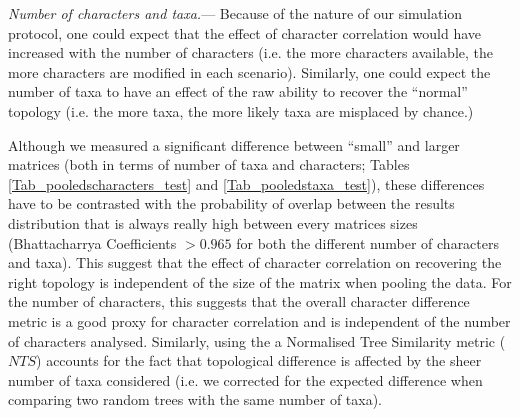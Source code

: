 \documentclass[12pt,letterpaper]{article}
\renewcommand{\subsubsection}[1]{%
\vspace{2ex}
\noindent
\textit{#1.}---}
\begin{document}
\subsubsection{Number of characters and taxa}
Because of the nature of our simulation protocol, one could expect that the effect of character correlation would have increased with the number of characters (i.e. the more characters available, the more characters are modified in each scenario).
Similarly, one could expect the number of taxa to have an effect of the raw ability to recover the ``normal'' topology (i.e. the more taxa, the more likely taxa are misplaced by chance.)

Although we measured a significant difference between ``small'' and larger matrices (both in terms of number of taxa and characters; Tables \ref{Tab_pooledscharacters_test} and \ref{Tab_pooledstaxa_test}), these differences have to be contrasted with the probability of overlap between the results distribution that is always really high between every matrices sizes (Bhattacharrya Coefficients $>0.965$ for both the different number of characters and taxa).
This suggest that the effect of character correlation on recovering the right topology is independent of the size of the matrix when pooling the data.
For the number of characters, this suggests that the overall character difference metric is a good proxy for character correlation and is independent of the number of characters analysed.
Similarly, using the a Normalised Tree Similarity metric ($NTS$) accounts for the fact that topological difference is affected by the sheer number of taxa considered (i.e. we corrected for the expected difference when comparing two random trees with the same number of taxa).
\end{document}
